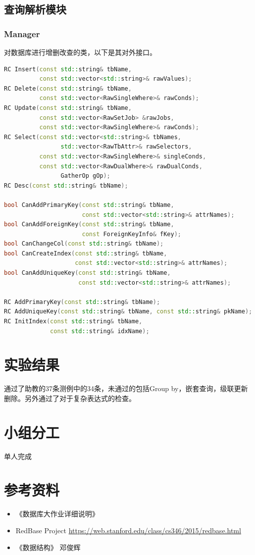 \documentclass{article}
\begin{document}
\subsection{查询解析模块}
\subsubsection{Manager}
对数据库进行增删改查的类，以下是其对外接口。
\begin{lstlisting}[language=C++]
RC Insert(const std::string& tbName,
          const std::vector<std::string>& rawValues);
RC Delete(const std::string& tbName,
          const std::vector<RawSingleWhere>& rawConds);
RC Update(const std::string& tbName,
          const std::vector<RawSetJob> &rawJobs,
          const std::vector<RawSingleWhere>& rawConds);
RC Select(const std::vector<std::string>& tbNames,
                std::vector<RawTbAttr>& rawSelectors, 
          const std::vector<RawSingleWhere>& singleConds,
          const std::vector<RawDualWhere>& rawDualConds,
                GatherOp gOp);
RC Desc(const std::string& tbName);

bool CanAddPrimaryKey(const std::string& tbName,
                      const std::vector<std::string>& attrNames);
bool CanAddForeignKey(const std::string& tbName,
                      const ForeignKeyInfo& fKey);
bool CanChangeCol(const std::string& tbName);
bool CanCreateIndex(const std::string& tbName,
                    const std::vector<std::string>& attrNames);
bool CanAddUniqueKey(const std::string& tbName,
                     const std::vector<std::string>& attrNames);

RC AddPrimaryKey(const std::string& tbName);
RC AddUniqueKey(const std::string& tbName, const std::string& pkName);
RC InitIndex(const std::string& tbName,
             const std::string& idxName);
\end{lstlisting}
\section{实验结果}
通过了助教的37条测例中的34条，未通过的包括Group by，嵌套查询，级联更新删除。另外通过了对于复杂表达式的检查。

\section{小组分工}
单人完成

\section{参考资料}
\begin{itemize}
    \item 《数据库大作业详细说明》
    \item RedBase Project \url{https://web.stanford.edu/class/cs346/2015/redbase.html}
    \item 《数据结构》 邓俊辉
\end{itemize}
\appendix
\end{document}
